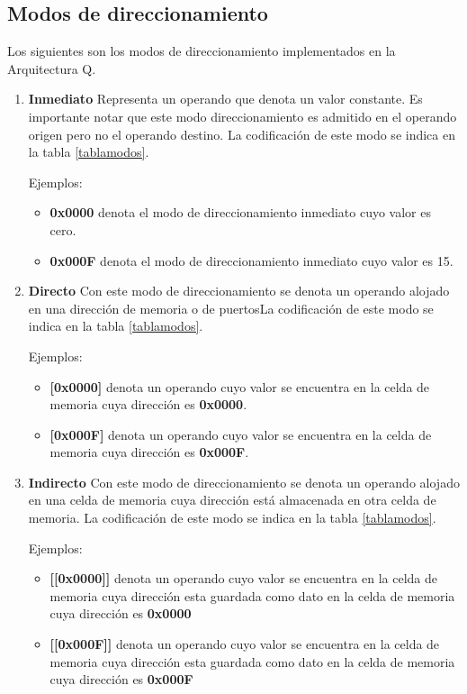 \subsection{Modos de direccionamiento}
Los siguientes son los modos de direccionamiento implementados en la Arquitectura Q.
\begin{enumerate}

\item \textbf{Inmediato} Representa un operando que denota un valor constante. Es importante notar que este modo direccionamiento es admitido en el operando origen pero no el operando destino. La codificación de este modo se indica en la tabla \ref{tablamodos}.

Ejemplos:
\begin{itemize}
\item \textbf{0x0000} denota el modo de direccionamiento inmediato cuyo valor es cero.
\item \textbf{0x000F} denota el modo de direccionamiento inmediato cuyo valor es 15.
\end{itemize}


\item \textbf{Directo}
Con este modo de direccionamiento se denota un operando alojado en una dirección de memoria o de puertosLa codificación de este modo se indica en la tabla \ref{tablamodos}.

Ejemplos:
\begin{itemize}
\item \textbf{[0x0000]} denota un operando cuyo valor se encuentra en la celda de memoria cuya dirección es \textbf{0x0000}.
\item \textbf{[0x000F]} denota  un operando cuyo valor se encuentra en la celda de memoria cuya dirección es \textbf{0x000F}.
\end{itemize}


\item \textbf{Indirecto}
Con este modo de direccionamiento se denota un operando alojado en una celda de memoria cuya dirección está almacenada en otra celda de memoria. La codificación de este modo se indica en la tabla \ref{tablamodos}.

Ejemplos:
\begin{itemize}
\item \textbf{[[0x0000]]} denota un operando cuyo valor se encuentra en la celda de memoria cuya dirección esta guardada como dato en la celda de memoria cuya dirección es \textbf{0x0000}
\item \textbf{[[0x000F]]} denota un operando cuyo valor se encuentra en la celda de memoria cuya dirección esta guardada como dato en la celda de memoria cuya dirección es \textbf{0x000F}
\end{itemize}


\end{enumerate}
